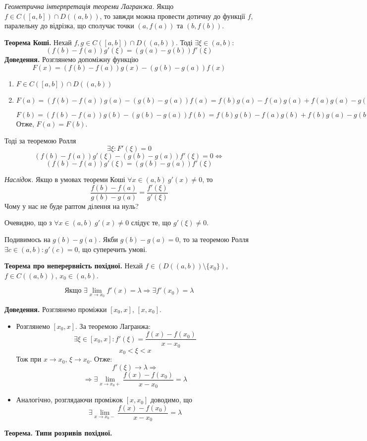 \documentclass[12pt]{report}
\begin{document}
\textit{Геометрична інтерпретація теореми Лагранжа.} Якщо $f \in C([a,b]) \cap D((a,b))$, то завжди можна провести дотичну до функції $f$, паралельну до відрізка, що сполучає точки $(a, f(a))$ та $(b, f(b))$.

\vspace{3mm}

\textbf{Теорема Коші.}  
Нехай $f, g \in C([a,b]) \cap D((a,b))$. Тоді $\exists \xi \in (a,b):$
$$(f(b) - f(a))g'(\xi) = (g(a) - g(b))f'(\xi)$$
\textbf{Доведення.} Розглянемо допоміжну функцію 
$$F(x) = (f(b) - f(a))g(x) - (g(b) - g(a))f(x)$$
\begin{enumerate}
\item $F \in C([a,b])\cap D((a,b))$
\item $F(a) = (f(b) - f(a))g(a) - (g(b) - g(a))f(a) = f(b)g(a) - f(a)g(a) + f(a)g(a) - g(b)f(a) = f(b)g(a) - g(b)f(a)$
	
\vspace{1mm}

$F(b) = (f(b) - f(a))g(b) - (g(b) - g(a))f(b) = f(b)g(b) - f(a)g(b) + f(b)g(a) - g(b)f(b) = f(b)g(a) - g(b)f(a)$
Отже, $F(a) = F(b)$.
\end{enumerate}

Тоді за теоремою Ролля 
$$\exists \xi : F'(\xi) = 0$$
$$(f(b) - f(a))g'(\xi) - (g(b) - g(a))f'(\xi) = 0 \Longleftrightarrow$$
$$(f(b) - f(a))g'(\xi) = (g(b) - g(a))f'(\xi) $$

\textit{Наслідок.} Якщо в умовах теореми Коші $\forall x \in (a,b) \ g'(x) \neq 0$, то
$$\frac{f(b) - f(a)}{g(b) - g(a)} = \frac{f'(\xi)}{g'(\xi)}$$
Чому у нас не буде раптом ділення на нуль?

Очевидно, що з $\forall x \in (a,b) \ g'(x) \neq 0$ слідує те, що $g'(\xi) \neq 0$.

Подивимось на $g(b) - g(a)$. Якби $g(b) - g(a) = 0$, то за теоремою Ролля $\exists c \in (a,b) : g'(c) = 0$, що суперечить умові.

\textbf{Теорема про неперервність похідної.} Нехай $f \in (D((a,b))\setminus \{x_0\})$, $f \in C((a,b))$, $x_0 \in (a,b)$.

$$\textrm{Якщо } \exists \lim_{x \to x_0}f'(x) = \lambda \Longrightarrow \exists f'(x_0) = \lambda$$

\textbf{Доведення.} Розглянемо проміжки $[x_0, x]$, $[x, x_0]$.

\begin{itemize}
\item Розглянемо $[x_0, x]$. За теоремою Лагранжа:
$$\exists \xi \in [x_0, x]: f'(\xi) = \frac{f(x) - f(x_0)}{x - x_0}$$
$$x_0 < \xi < x$$
Тож при $x \to x_0$, $\xi \to x_0$. Отже:
$$f'(\xi) \to \lambda \Longrightarrow$$
$$\Longrightarrow \exists \lim_{x \to x_0+}\frac{f(x) - f(x_0)}{x - x_0} = \lambda$$
\item Аналогічно, розглядаючи проміжок $[x, x_0]$ доводимо, що 
$$\exists \lim_{x\to x_0 - }\frac{f(x) - f(x_0)}{x - x_0} = \lambda$$

\end{itemize}
\textbf{Теорема. Типи розривів похідної.}
\end{document}
